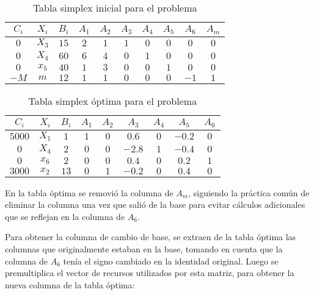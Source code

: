 \documentclass[a4paper,11pt]{article}
\begin{document}
\begin{table}[h!]
\centering
\begin{tabular}{ | c | c | c || c | c | c | c | c | c | c | }
  \hline
  \(C_i\) & \(X_i\) & \(B_i\) & \(A_1\) & \(A_2\) & \(A_3\) & \(A_4\) & \(A_5\) & \(A_6\) & \(A_m\) \\ \hline
    \(0\) & \(X_3\) & \(15\)  & \(2\)   & \(1\)   & \(1\)   & \(0\)   & \(0\)   & \(0\)   & \(0\) \\ \hline
 \(0\)    & \(X_4\) & \(60\)  & \(6\)   & \(4\)   & \(0\)   & \(1\)   & \(0\)   & \(0\)   & \(0\) \\ \hline
  \(0\)   & \(x_5\) & \(40\)  & \(1\)   & \(3\)   & \(0\)   & \(0\)   & \(1\)   & \(0\)   & \(0\) \\ \hline
  \(-M\)  & \(m\)   & \(12\)  & \(1\)   & \(1\)   & \(0\)   & \(0\)   & \(0\)   & \(-1\)  & \(1\) \\ \hline
\end{tabular}
\caption{Tabla simplex inicial para el problema}
\end{table}

\begin{table}[h!]
\centering
\begin{tabular}{ | c | c | c || c | c | c | c | c | c | }
  \hline
  \(C_i\)  & \(X_i\) & \(B_i\) & \(A_1\) & \(A_2\) & \(A_3\)  & \(A_4\) & \(A_5\)  & \(A_6\) \\ \hline
 \(5000\)  & \(X_1\) & \(1\)   & \(1\)   & \(0\)   & \(0.6\)  & \(0\)   & \(-0.2\) & \(0\) \\ \hline
 \(0\)     & \(X_4\) & \(2\)   & \(0\)   & \(0\)   & \(-2.8\) & \(1\)   & \(-0.4\) & \(0\) \\ \hline
  \(0\)    & \(x_6\) & \(2\)   & \(0\)   & \(0\)   & \(0.4\)  & \(0\)   & \(0.2\)  & \(1\) \\ \hline
  \(3000\) & \(x_2\) & \(13\)  & \(0\)   & \(1\)   & \(-0.2\) & \(0\)   & \(0.4\)  & \(0\) \\ \hline
\end{tabular}
\caption{Tabla simplex óptima para el problema}
\end{table}

\FloatBarrier

En la tabla óptima se removió la columna de \(A_m\), siguiendo la práctica
común de eliminar la columna una vez que salió de la base para evitar cálculos
adicionales que se reflejan en la columna de \(A_6\).

Para obtener la columna de cambio de base, se extraen de la tabla óptima las
columnas que originalmente estaban en la base, tomando en cuenta que la columna
de \(A_6\) tenía el signo cambiado en la identidad original. Luego se
premultiplica el vector de recursos utilizados por esta matriz, para obtener la
nueva columna de la tabla óptima:
\end{document}
